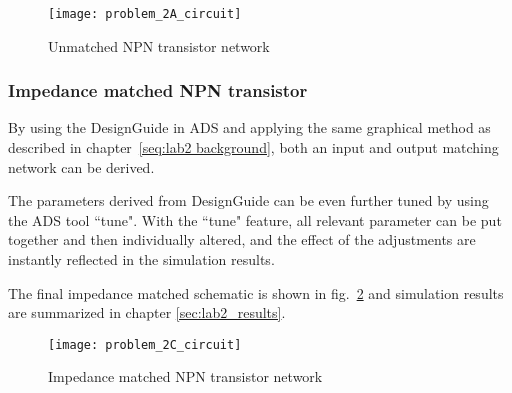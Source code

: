 \documentclass[report.tex]{subfiles}
\begin{document}
\begin{figure}[h]
    \centering
    \texttt{[image: problem\_2A\_circuit]}
    \caption{Unmatched NPN transistor network}
    \label{fig:problem 2A circuit}
\end{figure}

\subsubsection{Impedance matched NPN transistor}
By using the DesignGuide in ADS and applying the same graphical method as described in chapter~\ref{seq:lab2 background}, both an input and output matching network can be derived.

The parameters derived from DesignGuide can be even further tuned by using the ADS tool ``tune". With the ``tune" feature, all relevant parameter can be put together and then individually altered, and the effect of the adjustments are instantly reflected in the simulation results.

The final impedance matched schematic is shown in fig.~\ref{fig:problem 2C circuit} and simulation results are summarized in chapter \ref{sec:lab2_results}.

\begin{figure}[h]
    \centering
    \texttt{[image: problem\_2C\_circuit]}
    \caption{Impedance matched NPN transistor network}
    \label{fig:problem 2C circuit}
\end{figure}
\end{document}
